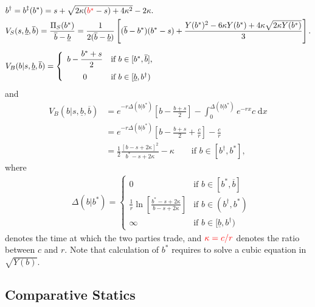     \begin{align*}
    &b^\dagger=b^\ddagger(b^*) 
    =s+\sqrt{2\kappa({\color{red}b^*}-s)+4\kappa^2}-2\kappa. 
    \\
    &
    V_S(s,\underline b,\overline b) = \frac{\Pi_S(b^*)}{\overline b-\underline b}
    =
    \frac{1}{2(\overline b-\underline b)}\left[(\overline b-b^*)(b^*-s)+ \frac{Y(b^*)^2-6\kappa Y(b^*)+4\kappa\sqrt{2\kappa Y(b^*)}}{3}\right].
    \\[5pt]
    &V_B(b|s,\underline b, \overline b)= 
    \left\{
    \begin{array}{cl}
    \displaystyle b-\frac{b^*+s}{2} & \text{if $b\in[b^*,\overline b]$,}
    \\[10pt]
    0 &\text{if $b\in[\underline b, b^\dagger)$}
    \end{array}
    \right. 
    \end{align*}
and
	\begin{align*}
	V_B(b|s,\underline b,\overline b) & = e^{-r\Delta(b|b^*)}\left[b-\frac{b+s}{2}\right]-\int_0^{\Delta(b|b^*)} e^{-rx}c \;\text{d}x 
	\\
	& = e^{-r\Delta(b|b^*)}\left[b-\frac{b+s}{2} + \frac{c}{r}\right]-\frac{c}{r}
	\\
	&= \frac{1}{2}\frac{[b-s+2\kappa]^2}{b^*-s+2\kappa}-\kappa
	\qquad \text{if $b\in [b^\dagger, b^*]$}, 
	\end{align*}
 where
    \begin{align*}
    & \Delta(b|b^*) = 
    \left\{
    \begin{array}{cl}
    0 & \text{if $b\in[b^*,\overline b]$}
    \\
    \displaystyle \frac{1}{r} \ln \left[\frac{b^*-s+2\kappa}{b-s+2\kappa}\right] & \text{if $b\in(b^\dagger,b^*)$}
    \\
    \infty & \text{if $b\in[\underline b, b^\dagger)$}
    \end{array}
    \right.
    \end{align*}
denotes the time at which the two parties trade, and $\color{red}\kappa=c/r$ denotes the ratio between $c$ and $r$. Note that calculation of $b^*$ requires to solve a cubic equation in $\sqrt{Y(b)}$. 






\subsection{Comparative Statics}

